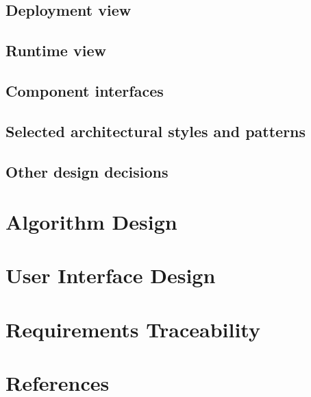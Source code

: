 \documentclass[]{report}
\begin{document}
\section{Deployment view}


\section{Runtime view}


\section{Component interfaces}


\section{Selected architectural styles and patterns}


\section{Other design decisions}


\chapter{Algorithm Design}

\chapter{User Interface Design}

\chapter{Requirements Traceability}

\chapter{References}
\end{document}
